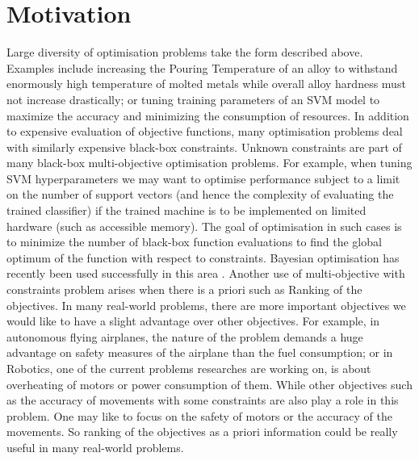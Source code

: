 \section{Motivation}\label{sec:mot}
Large diversity of optimisation problems take the form described above. Examples include increasing the Pouring Temperature of an alloy to withstand enormously high temperature of molted metals while overall alloy hardness must not increase drastically; or tuning training parameters of an SVM‌ model to maximize the accuracy and minimizing the consumption of resources. In addition to expensive evaluation of objective functions, many optimisation problems deal with similarly expensive black-box constraints. Unknown constraints are part of many black-box multi-objective optimisation problems. For example, when tuning SVM hyperparameters we may want to optimise performance subject to a limit on the number of support vectors (and hence the complexity of evaluating the trained classifier) if the trained machine is to be implemented on limited hardware (such as accessible memory). The goal of optimisation
in such cases is to minimize the number of black-box function evaluations to find the global optimum of the function with respect to constraints. Bayesian optimisation has recently been used successfully in this area \cite{MajidPaper2018}.
Another use of multi-objective with constraints problem arises when there is a priori such as Ranking of the objectives. In many real-world problems, there are more important objectives we would like to have a slight advantage over other objectives. For example, in autonomous flying airplanes, the nature of the problem demands a huge advantage on safety measures of the airplane than the fuel consumption; or in Robotics, one of the current problems researches are working on, is about overheating of motors or power consumption of them. While other objectives such as the accuracy of movements with some constraints are also play a role in this problem. One may like to focus on the safety of motors or the accuracy of the movements. So ranking of the objectives as a priori information could be really useful in many real-world problems.

